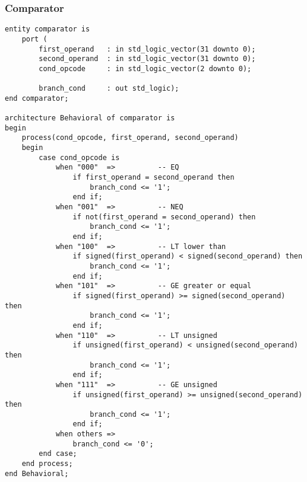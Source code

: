 \subsubsection{Comparator}
\begin{code}
\label{code:IE_comparator}  
\begin{verbatim}
entity comparator is
    port ( 
        first_operand   : in std_logic_vector(31 downto 0);
        second_operand  : in std_logic_vector(31 downto 0);
        cond_opcode     : in std_logic_vector(2 downto 0);
        
        branch_cond     : out std_logic);
end comparator;

architecture Behavioral of comparator is
begin
    process(cond_opcode, first_operand, second_operand)
    begin
        case cond_opcode is
            when "000"  =>          -- EQ
                if first_operand = second_operand then 
                    branch_cond <= '1';
                end if;
            when "001"  =>          -- NEQ
                if not(first_operand = second_operand) then 
                    branch_cond <= '1';
                end if;
            when "100"  =>          -- LT lower than
                if signed(first_operand) < signed(second_operand) then 
                    branch_cond <= '1';
                end if;
            when "101"  =>          -- GE greater or equal
                if signed(first_operand) >= signed(second_operand) then 
                    branch_cond <= '1';
                end if;
            when "110"  =>          -- LT unsigned
                if unsigned(first_operand) < unsigned(second_operand) then 
                    branch_cond <= '1';
                end if;
            when "111"  =>          -- GE unsigned
                if unsigned(first_operand) >= unsigned(second_operand) then 
                    branch_cond <= '1';
                end if;
            when others =>
                branch_cond <= '0';
        end case;
    end process;
end Behavioral;
\end{verbatim}
\end{code}
\newpage



